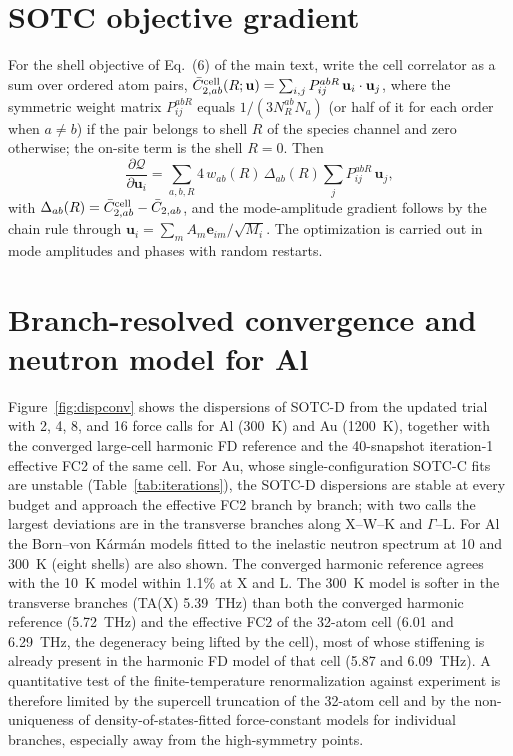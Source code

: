 \documentclass[aip,jap,reprint,amsmath,amssymb,floatfix]{revtex4-2}
\begin{document}
\section{SOTC objective gradient}

For the shell objective of Eq.~(6) of the main text, write the cell
correlator as a sum over ordered atom pairs,
$\bar C_{2,ab}^{\rm cell}(R;\mathbf u)=\sum_{i,j}P^{abR}_{ij}\,\mathbf u_i\cdot\mathbf u_j$,
where the symmetric weight matrix $P^{abR}_{ij}$ equals $1/(3N_R^{ab}N_a)$ (or half
of it for each order when $a\neq b$) if the pair belongs to shell $R$ of the
species channel and zero otherwise; the on-site term is the shell $R=0$. Then
\begin{equation}
\frac{\partial\mathcal Q}{\partial\mathbf u_i}=
\sum_{a,b,R}4\,w_{ab}(R)\,\Delta_{ab}(R)\sum_jP^{abR}_{ij}\,\mathbf u_j ,
\end{equation}
with $\Delta_{ab}(R)=\bar C_{2,ab}^{\rm cell}-\bar C_{2,ab}$, and the
mode-amplitude gradient follows by the chain rule through
$\mathbf u_i=\sum_m A_m\mathbf e_{im}/\sqrt{M_i}$. The optimization is
carried out in mode amplitudes and phases with random restarts.

\section{Branch-resolved convergence and neutron model for Al}

Figure~\ref{fig:dispconv} shows the dispersions of SOTC-D from the updated
trial with 2, 4, 8, and 16 force calls for Al (300~K) and Au (1200~K),
together with the converged large-cell harmonic FD reference and the
40-snapshot iteration-1 effective FC2 of the same cell. For Au, whose
single-configuration SOTC-C fits are unstable (Table~\ref{tab:iterations}),
the SOTC-D dispersions are stable at every budget and approach the effective
FC2 branch by branch; with two calls the largest deviations are in the
transverse branches along X--W--K and $\Gamma$--L. For Al the Born--von
K\'arm\'an models fitted to the inelastic neutron spectrum at 10 and 300~K
\cite{kresch2008} (eight shells) are also shown. The converged harmonic reference agrees with the 10~K
model within 1.1\% at X and L. The 300~K model is softer in the transverse
branches (TA(X) 5.39~THz) than both the converged harmonic reference
(5.72~THz) and the effective FC2 of the 32-atom cell (6.01 and 6.29~THz, the
degeneracy being lifted by the cell), most of whose stiffening is already
present in the harmonic FD model of that cell (5.87 and 6.09~THz). A
quantitative test of the finite-temperature renormalization against
experiment is therefore limited by the supercell truncation of the
32-atom cell and by the non-uniqueness of density-of-states-fitted
force-constant models for individual branches, especially away from the
high-symmetry points.
\end{document}
